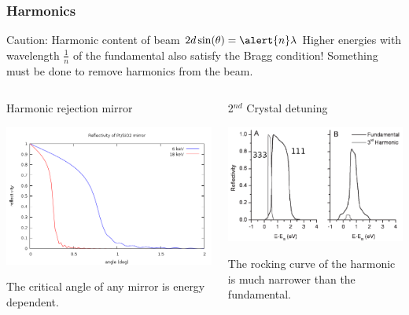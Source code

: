 \documentclass[10pt, xcolor=x11names, compress]{beamer}
\begin{document}
\begin{frame}
  \frametitle{Harmonics}
  \begin{alertblock}{Caution: Harmonic content of beam}
    $2d\sin(\theta) = \alert{n}\lambda$ \qquad
    Higher energies with wavelength $\frac1n$ of the fundamental also
    satisfy the Bragg condition!  Something must be done to remove
    harmonics from the beam.
  \end{alertblock}
  \begin{columns}
    \begin{column}{0.5\linewidth}
      \begin{center}
        Harmonic rejection mirror

        \includegraphics[width=0.9\linewidth]{bl/mir.png}

      \end{center}
      \footnotesize
      The critical angle of any mirror is energy dependent.
    \end{column}
    \begin{column}{0.5\linewidth}
      \begin{center}
        2$^{nd}$ Crystal detuning

        \includegraphics[width=0.9\linewidth]{bl/detune.png}
      \end{center}

      \footnotesize
      The rocking curve of the harmonic is much narrower than the
      fundamental. 
    \end{column}
  \end{columns}
\end{frame}
\end{document}
